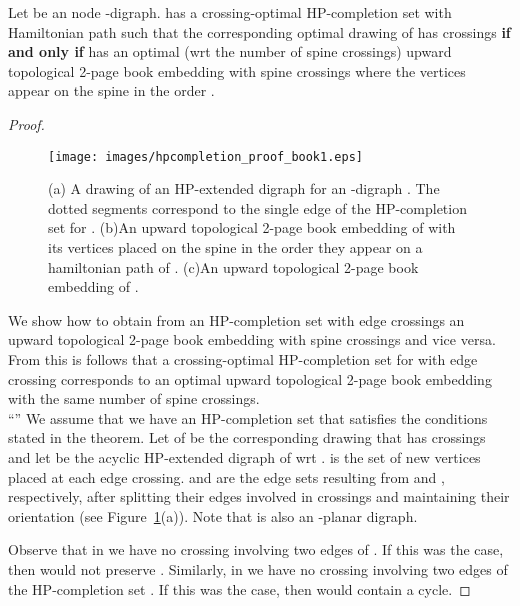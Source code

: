 \documentclass{myllncs-mixalis}
\begin{document}
\begin{theorem}
\label{thm:BEequivHPcompletionSet} Let  be an  node
-digraph.  has a crossing-optimal   HP-completion set 
with Hamiltonian path  such that the
corresponding optimal drawing  of   has  crossings \textbf{if and only if}  has an
optimal (wrt the number of spine crossings) upward topological
2-page book embedding with  spine crossings where the vertices
appear on the spine in the order .
\end{theorem}

\begin{proof}

\begin{figure}[htb]
    \begin{minipage}{\textwidth}
    \centering
    \texttt{[image: images/hpcompletion\_proof\_book1.eps]}
    \caption{(a) A drawing of an HP-extended digraph for an  -digraph .
     The dotted segments correspond to the single edge  of the HP-completion set for .
     (b)An upward topological 2-page book embedding of  with
     its
     vertices   placed on the spine in the order they appear
     on a hamiltonian path of .
     (c)An upward topological 2-page book embedding of . }
    \label{fig:HPcompletionExample}
  \end{minipage}
\end{figure}

We  show how to obtain from an HP-completion set with  edge
crossings  an upward topological 2-page book embedding with 
spine crossings and vice versa. From this is follows that   a
crossing-optimal  HP-completion set for  with  edge crossing
corresponds to an optimal upward
topological 2-page book embedding  with the same number of spine crossings.\\
``'' We assume that we have an HP-completion set
  that satisfies the conditions stated in the theorem. Let
 of  be the corresponding
 drawing that has  crossings and let  be the acyclic HP-extended digraph of 
wrt .    is the set of new vertices placed at
each edge crossing.   and  are the edge sets
resulting from  and ,
 respectively, after splitting their edges
 involved in crossings and maintaining their orientation
 (see Figure~\ref{fig:HPcompletionExample}(a)). Note that  is also an -planar digraph.


 Observe that in  we have no crossing involving two edges of .
 If this was the
 case, then  would not preserve .
 Similarly, in  we have no crossing involving two edges of the HP-completion set .
 If this was the
 case, then  would contain a cycle.


\end{proof}
\end{document}
